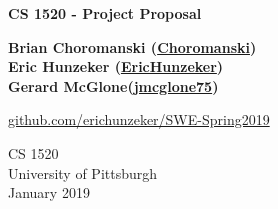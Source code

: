 \documentclass{article}
\begin{document}
\begin{titlepage}
    \begin{center}
        \vspace*{1cm}
        
        \LARGE
        \textbf{CS 1520 - Project Proposal}
        
        \vspace{1.5cm}
        
        \textbf{Brian Choromanski (\href{https://github.com/Choromanski}{\faGithub \space Choromanski})\\Eric Hunzeker (\href{https://github.com/erichunzeker}{\faGithub \space EricHunzeker})\\Gerard McGlone(\href{https://github.com/jmcglone75}{\faGithub \space jmcglone75})}
        
        \vfill
        
        \href{https://github.com/erichunzeker/SWE-Spring2019}{\faGithub \space github.com/erichunzeker/SWE-Spring2019}
        
        \vspace{0.8cm}
        
        \normalsize
        CS 1520\\
        University of Pittsburgh\\
        January 2019
        
    \end{center}
\end{titlepage}

\newpage

\end{document}
